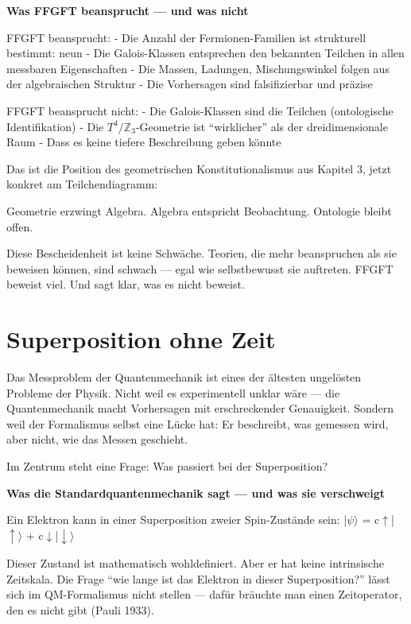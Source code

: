 \documentclass[11pt,oneside]{book}
\begin{document}
\textbf{Was FFGFT beansprucht — und was nicht}


FFGFT beansprucht:
- Die Anzahl der Fermionen-Familien ist strukturell bestimmt: neun
- Die Galois-Klassen entsprechen den bekannten Teilchen in allen
  messbaren Eigenschaften
- Die Massen, Ladungen, Mischungswinkel folgen aus der algebraischen
  Struktur
- Die Vorhersagen sind falsifizierbar und präzise


FFGFT beansprucht nicht:
- Die Galois-Klassen sind die Teilchen (ontologische Identifikation)
- Die $T^4/\mathbb{Z}_3$-Geometrie ist \enquote{wirklicher} als der dreidimensionale Raum
- Dass es keine tiefere Beschreibung geben könnte


Das ist die Position des geometrischen Konstitutionalismus aus Kapitel 3,
jetzt konkret am Teilchendiagramm:


Geometrie erzwingt Algebra. Algebra entspricht Beobachtung. Ontologie
bleibt offen.


Diese Bescheidenheit ist keine Schwäche. Teorien, die mehr beanspruchen
als sie beweisen können, sind schwach — egal wie selbstbewusst sie
auftreten. FFGFT beweist viel. Und sagt klar, was es nicht beweist.








\chapter{Superposition ohne Zeit}

Das Messproblem der Quantenmechanik ist eines der ältesten ungelösten
Probleme der Physik. Nicht weil es experimentell unklar wäre — die
Quantenmechanik macht Vorhersagen mit erschreckender Genauigkeit. Sondern
weil der Formalismus selbst eine Lücke hat: Er beschreibt, was gemessen
wird, aber nicht, wie das Messen geschieht.


Im Zentrum steht eine Frage: Was passiert bei der Superposition?


\textbf{Was die Standardquantenmechanik sagt — und was sie verschweigt}


Ein Elektron kann in einer Superposition zweier Spin-Zustände sein:
|$\psi\rangle$ = c$\uparrow$|$\uparrow\rangle$ + c$\downarrow$|$\downarrow\rangle$


Dieser Zustand ist mathematisch wohldefiniert. Aber er hat keine
intrinsische Zeitskala. Die Frage \enquote{wie lange ist das Elektron in dieser
Superposition?} lässt sich im QM-Formalismus nicht stellen — dafür
bräuchte man einen Zeitoperator, den es nicht gibt (Pauli 1933).
\end{document}
